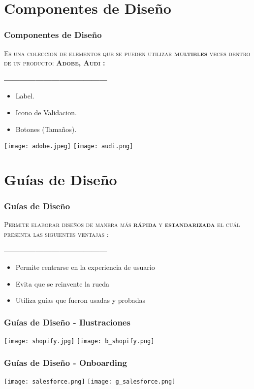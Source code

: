 \documentclass[11pt]{beamer}
\begin{document}
\section{Componentes de Diseño}
\begin{frame}
\frametitle{Componentes de Diseño}
\begin{itemize}
    \textsc{Es una coleccion de elementos que se pueden utilizar {\bf multibles} veces dentro de un producto: {\bf Adobe, Audi :}}
\end{itemize}
\textbf{---------------------------------------}
\begin{itemize}
    \item Label.
    \item Icono de Validacion.
    \item Botones (Tamaños).
\end{itemize}
{\texttt{[image: adobe.jpeg]}}
{\texttt{[image: audi.png]}}
\end{frame}

\section{Guías de Diseño}
\begin{frame}
\frametitle{Guías de Diseño}
\begin{itemize}
    \textsc{Permite elaborar diseños de manera más {\bf rápida} y {\bf estandarizada}  el cuál presenta las siguientes ventajas :}
\end{itemize}
\textbf{---------------------------------------}
\begin{itemize}
    \item Permite centrarse en la experiencia de usuario
    \item Evita que se reinvente la rueda
    \item Utiliza guías que fueron usadas y probadas
\end{itemize}
\end{frame}

\begin{frame}
\frametitle{Guías de Diseño - Ilustraciones}
{\texttt{[image: shopify.jpg]}}
{\texttt{[image: b\_shopify.png]}}
\centering
\end{frame}


\begin{frame}
\frametitle{Guías de Diseño - Onboarding}
{\texttt{[image: salesforce.png]}}
{\texttt{[image: g\_salesforce.png]}}
\centering
\end{frame}
\end{document}
